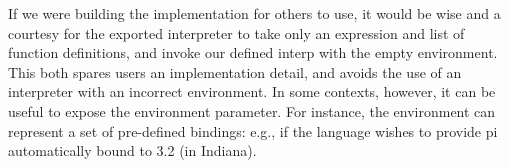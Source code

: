 
If we were building the implementation for others to use, it would be wise and a
courtesy for the exported interpreter to take only an expression and list of
function definitions, and invoke our defined interp with the empty environment.
This both spares users an implementation detail, and avoids the use of an
interpreter with an incorrect environment. In some contexts, however, it can be
useful to expose the environment parameter. For instance, the environment can
represent a set of pre-defined bindings: e.g., if the language wishes to provide
pi automatically bound to 3.2 (in Indiana).
